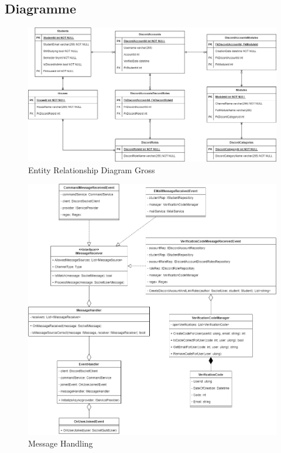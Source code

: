 \documentclass[a4paper, table]{article}
\begin{document}
\subsection{Diagramme}
\begin{landscape}
    \begin{figure}[hb]
        \centering
        \hspace*{-4.5cm}
        \includegraphics[width=1.6\textwidth]{img/ER-Diagramm.png}
        \caption{Entity Relationship Diagram Gross}
        \label{fig:ER-Diagram-big}
    \end{figure}
\end{landscape}

\begin{figure}[ht]
    \centering
    \hspace*{-2cm}
    \includegraphics[width=1.3\textwidth]{img/MessageHandling.png}
    \caption{Message Handling}
    \label{fig:message-handling}
\end{figure}
\clearpage
\end{document}
